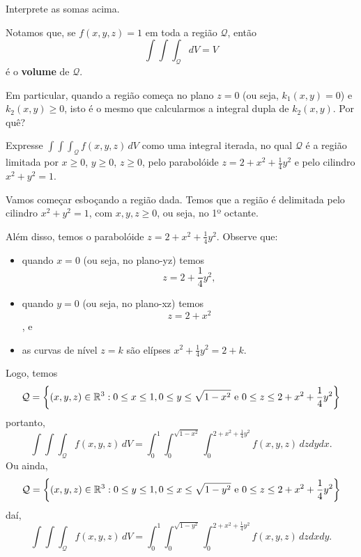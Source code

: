 \begin{exercise}
    Interprete as somas acima.
\end{exercise}

\begin{remark}
    Notamos que, se \(f(x,y,z) = 1\) em toda a região \(\mathcal{Q}\), então \[\int\int\int_\mathcal{Q} dV = V\] é o \textbf{volume} de \(\mathcal{Q}\).

    Em particular, quando a região começa no plano \(z=0\) (ou seja, \(k_1(x,y) = 0\)) e \(k_2(x,y)\geq 0\), isto é o mesmo que calcularmos a integral dupla de \(k_2(x,y)\). Por quê?
\end{remark}

\begin{example}
    Expresse \(\int\int\int_\mathcal{Q} f(x,y,z)\, dV\) como uma integral iterada, no qual \(\mathcal{Q}\) é a região limitada por \(x\geq 0\), \(y\geq 0\), \(z\geq 0\), pelo parabolóide \(z = 2 + x^2 + \frac{1}{4}y^2\) e pelo cilindro \(x^2 + y^2 = 1\).

    Vamos começar esboçando a região dada. Temos que a região é delimitada pelo cilindro \(x^2 + y^2 = 1\), com \(x,y,z\geq 0\), ou seja, no 1º octante. 
    
    Além disso, temos o parabolóide \(z = 2 + x^2 + \frac{1}{4}y^2\). Observe que:
        \begin{itemize}
            \item quando \(x=0\) (ou seja, no plano-yz) temos \[z = 2 + \frac{1}{4}y^2,\]
            \item quando \(y=0\) (ou seja, no plano-xz) temos \[z = 2 + x^2\], e
            \item as curvas de nível \(z=k\) são elípses \(x^2 + \frac{1}{4}y^2 = 2+k\).
        \end{itemize}

    Logo, temos
        \[\mathcal{Q} = \left\{(x,y,z)\in\mathbb{R}^3 : 0\leq x\leq 1, 0\leq y\leq\sqrt{1-x^2} \text{ e } 0\leq z\leq 2 + x^2 + \frac{1}{4}y^2\right\}\]
    portanto,
        \[\int\int\int_\mathcal{Q} f(x,y,z)\, dV = \int_0^1 \int_0^{\sqrt{1-x^2}}\int_0^{2+x^2+\frac{1}{4}y^2} f(x,y,z)\, dz dy dx.\]
    Ou ainda,
        \[\mathcal{Q} = \left\{(x,y,z)\in\mathbb{R}^3 : 0\leq y\leq 1, 0\leq x\leq \sqrt{1-y^2} \text{ e } 0\leq z\leq 2+x^2+\frac{1}{4}y^2\right\}\]
    daí,
        \[\int\int\int_\mathcal{Q} f(x,y,z)\, dV = \int_0^1 \int_0^{\sqrt{1-y^2}} \int_0^{2+x^2+\frac{1}{4}y^2} f(x,y,z)\, dz dx dy.\]
\end{example}

